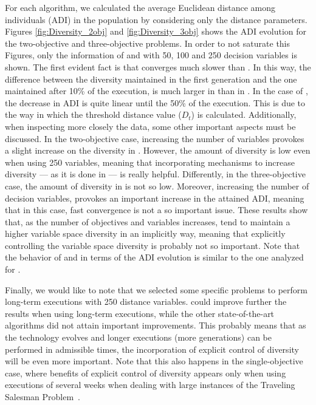 For each algorithm, we calculated the average Euclidean distance among individuals (ADI) in the population by considering only 
the distance parameters.
%
Figures \ref{fig:Diversity_2obj} and \ref{fig:Diversity_3obj} shows the ADI evolution for the two-objective and three-objective problems.
%
In order to not saturate this Figures, only the information of \VSDMOEA{} and \RMOEA{} with 50, 100 and 250 decision variables is shown.
%
The first evident fact is that \VSDMOEA{} converges much slower than \RMOEA{}.
%
In this way, the difference between the diversity maintained in the first generation and the one maintained after 10\% of the execution,
is much larger in \RMOEA{} than in \VSDMOEA{}.
%
In the case of \VSDMOEA{}, the decrease in ADI is quite linear until the 50\% of the execution.
%
This is due to the way in which the threshold distance value ($D_t$) is calculated.
%
Additionally, when inspecting more closely the data, some other important aspects must be discussed. 
%
In the two-objective case, increasing the number of variables provokes a slight increase on the diversity in \RMOEA{}.
%
However, the amount of diversity is low even when using 250 variables, meaning that incorporating mechanisms to increase diversity --- as it is done in \VSDMOEA{} ---
is really helpful.
%
Differently, in the three-objective case, the amount of diversity in \RMOEA{} is not so low.
%
Moreover, increasing the number of decision variables, provokes an important increase in the attained ADI, meaning that in this case,
fast convergence is not a so important issue.
%
These results show that, as the number of objectives and variables increases, \MOEAS{} tend to maintain a higher variable space diversity
in an implicitly way, meaning that explicitly controlling the variable space diversity is probably not so important.
%
Note that the behavior of \NSGAII{} and \MOEAD{} in terms of the ADI evolution is similar to the one analyzed for \RMOEA{}.

Finally, we would like to note that we selected some specific problems to perform long-term executions with 250 distance variables.
%
\VSDMOEA{} could improve further the results when using long-term executions, while the other state-of-the-art algorithms did not attain
important improvements.
%
This probably means that as the technology evolves and longer executions (more generations) can be performed in admissible times,
the incorporation of explicit control of diversity will be even more important.
%
Note that this also happens in the single-objective case, where benefits of explicit control of diversity appears only when using executions of
several weeks when dealing with large instances of the Traveling Salesman Problem~\cite{segura2015novel}.
%






